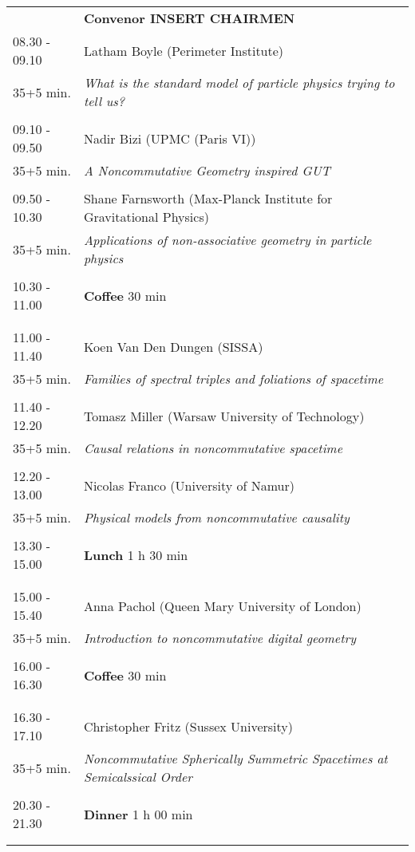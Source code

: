 \begin{longtable}{p{3cm}p{13cm}}
&\hfill {\bf Convenor INSERT CHAIRMEN }\\ 
08.30 - 09.10 & Latham Boyle (Perimeter Institute)\\ 
35+5 min. & {\it What is the standard model of particle physics trying to tell us?}\\ 
 & \\ 
09.10 - 09.50 & Nadir Bizi (UPMC (Paris VI))\\ 
35+5 min. & {\it A Noncommutative Geometry inspired GUT}\\ 
 & \\ 
09.50 - 10.30 & Shane Farnsworth (Max-Planck Institute for Gravitational Physics)\\ 
35+5 min. & {\it Applications of non-associative geometry in particle physics}\\ 
 & \\ 
10.30 - 11.00 & {\bf Coffee} \hfill 30 min \\ 
 & \\ 
 & \\ 
11.00 - 11.40 & Koen Van Den Dungen (SISSA)\\ 
35+5 min. & {\it Families of spectral triples and foliations of spacetime}\\ 
 & \\ 
11.40 - 12.20 & Tomasz Miller (Warsaw University of Technology)\\ 
35+5 min. & {\it Causal relations in noncommutative spacetime}\\ 
 & \\ 
12.20 - 13.00 & Nicolas Franco (University of Namur)\\ 
35+5 min. & {\it Physical models from noncommutative causality}\\ 
 & \\ 
13.30 - 15.00 & {\bf Lunch} \hfill 1 h 30 min \\ 
 & \\ 
 & \\ 
15.00 - 15.40 & Anna Pachol (Queen Mary University of London)\\ 
35+5 min. & {\it Introduction to noncommutative digital geometry}\\ 
 & \\ 
16.00 - 16.30 & {\bf Coffee} \hfill 30 min \\ 
 & \\ 
 & \\ 
16.30 - 17.10 & Christopher Fritz (Sussex University)\\ 
35+5 min. & {\it Noncommutative Spherically Summetric Spacetimes at Semicalssical Order}\\ 
 & \\ 
20.30 - 21.30 & {\bf Dinner} \hfill 1 h 00 min \\ 
 & \\ 
 & \\ 
\end{longtable}

